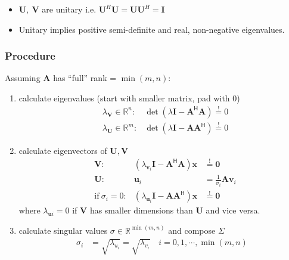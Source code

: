 
\begin{itemize}
    \item $\mathbf{U},\:\mathbf{V}$ are unitary i.e. $\mathbf{U}^H \mathbf{U}=\mathbf{U}\mathbf{U}^H=\mathbf{I}$
    \item Unitary implies positive semi-definite and real, non-negative eigenvalues.
\end{itemize}

\subsubsection{Procedure}
Assuming $\mathbf{A}$ has ``full'' rank = $\min(m,n)$:
\begin{enumerate}
    \item calculate eigenvalues (start with smaller matrix, pad with 0)
          \noindent\begin{align*}
               & \lambda_{\mathbf{V}}\in \mathbb{R}^n: & \det\left(\lambda \mathbf{I}-\mathbf{A}^{\mathsf{H}}\mathbf{A}\right)\overset{!}{=}0 \\
               & \lambda_{\mathbf{U}}\in \mathbb{R}^m: & \det\left(\lambda \mathbf{I}-\mathbf{AA}^{\mathsf{H}}\right)\overset{!}{=}0
          \end{align*}
    \item calculate eigenvectors of $\mathbf{U},\mathbf{V}$
          \noindent\begin{align*}
               & \mathbf{V}:                & \left(\lambda_{\mathbf{v}_i} \mathbf{I} -\mathbf{A}^{\mathsf{H}} \mathbf{A}\right)\mathbf{x} & \overset{!}{=}\mathbf{0}          \\
               & \mathbf{U}:                & \mathbf{u}_i                                                                                 & = \frac{1}{\sigma_i}\mathbf{Av}_i \\
               & \mathrm{if}~\sigma_i = 0 : & \left(\lambda_{\mathbf{u}_i} \mathbf{I} -\mathbf{AA}^{\mathsf{H}}\right)\mathbf{x}           & \overset{!}{=}\mathbf{0}
          \end{align*}
          where $\lambda_{\mathbf{u}i}=0$ if $\mathbf{V}$ has smaller dimensions than $\mathbf{U}$ and vice versa.
    \item calculate singular values $\sigma\in \mathbb{R}^{\min(m,n)}$ and compose $\Sigma$
          \noindent\begin{align*}
              \sigma_i & = \sqrt{\lambda_{u_i}} = \sqrt{\lambda_{v_i}}\quad i=0,1,\cdots, \min(m,n) \\

\end{align*}
\end{enumerate}

